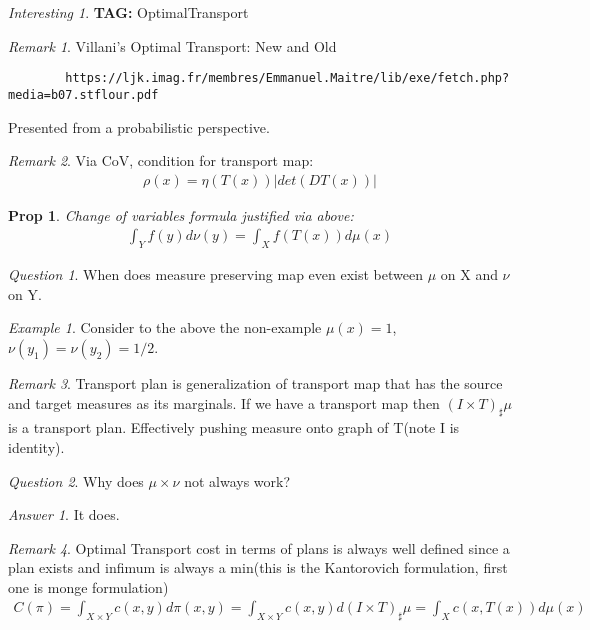 \documentclass[11pt]{article}
\newtheorem{prop}{Prop}
\theoremstyle{remark}
\newtheorem{remark}{Remark}
\newtheorem{quest}{Question}
\newtheorem{ans}{Answer}
\newtheorem{interest}{Interesting}
\newtheorem{example}{Example}
\begin{document}
\begin{interest}
\textbf{TAG:} OptimalTransport

\begin{remark}
	Villani's Optimal Transport: New and Old
	\begin{verbatim}
		https://ljk.imag.fr/membres/Emmanuel.Maitre/lib/exe/fetch.php?media=b07.stflour.pdf
	\end{verbatim}
	Presented from a probabilistic perspective.
\end{remark}

\begin{remark}
	Via CoV, condition for transport map:
	\begin{align*}
		\rho(x) = \eta(T(x)) |det(DT(x))|
	\end{align*}
\end{remark}

\begin{prop}
	Change of variables formula justified via above:
	\begin{align*}
		\int_Y f(y) d\nu(y) = \int_X f(T(x))d\mu(x)
	\end{align*}
\end{prop}

\begin{quest}
	When does measure preserving map even exist between $\mu$ on X and $\nu$ on Y. 
\end{quest}

\begin{example}
	Consider to the above the non-example $\mu(x) = 1$, $\nu(y_1) = \nu(y_2) = 1/2$. 
\end{example}

\begin{remark}
	Transport plan is generalization of transport map that has the source and target measures as its marginals. If  we have a transport map then $(I \times T)_{\sharp}\mu$ is a transport plan. Effectively pushing measure onto graph of T(note I is identity). 
\end{remark}

\begin{quest}
	Why does $\mu \times \nu$ not always work? 
\end{quest}

\begin{ans}
	It does.
\end{ans}

\begin{remark}
	Optimal Transport cost in terms of plans is always well defined since a plan exists and infimum is always a min(this is the Kantorovich formulation, first one is monge formulation)
	\begin{align*}
		C(\pi) = \int_{X \times Y} c(x,y) d\pi(x,y) = \int_{X \times Y} c(x,y) d(I \times T)_{\sharp} \mu = \int_X c(x,T(x))d\mu(x)
	\end{align*}
\end{remark}


\end{interest}
\end{document}
